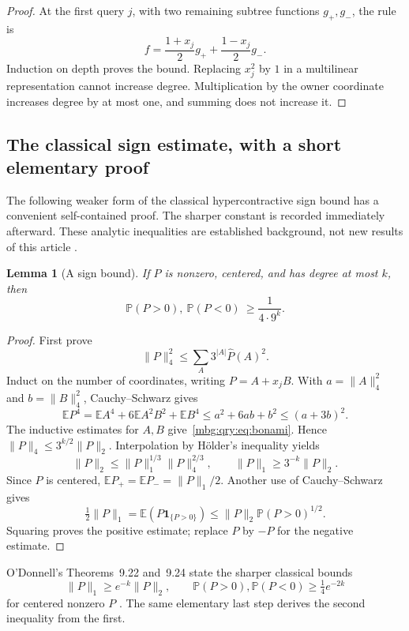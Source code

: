 \documentclass[11pt,letterpaper]{article}
\newtheorem{lemma}[theorem]{Lemma}
\theoremstyle{definition}
\newcommand{\E}{\mathbb E}
\newcommand{\Prb}{\mathbb P}
\newcommand{\ind}{\mathbf 1}
\begin{document}
\begin{proof}
At the first query \(j\), with two remaining subtree functions
\(g_+,g_-\), the rule is
\[
 f=\frac{1+x_j}{2}g_++\frac{1-x_j}{2}g_-.
\]
Induction on depth proves the bound. Replacing \(x_j^2\) by \(1\) in a
multilinear representation cannot increase degree. Multiplication by
the owner coordinate increases degree by at most one, and summing does
not increase it.
\end{proof}

\subsection{The classical sign estimate, with a short elementary proof}

The following weaker form of the classical hypercontractive sign bound
has a convenient self-contained proof. The sharper constant is recorded
immediately afterward. These analytic inequalities are established
background, not new results of this article \cite{qry:Bonami,qry:ODonnell}.

\begin{lemma}[A sign bound]
\label{mbg:qry:lem:sign}
If \(P\) is nonzero, centered, and has degree at most \(k\), then
\[
 \Prb(P>0),\ \Prb(P<0)\ \ge\frac{1}{4\cdot9^k}.
\]
\end{lemma}

\begin{proof}
First prove
\begin{equation}
 \|P\|_4^2\le\sum_A3^{|A|}\widehat P(A)^2.
 \label{mbg:qry:eq:bonami}
\end{equation}
Induct on the number of coordinates, writing \(P=A+x_jB\).
With \(a=\|A\|_4^2\) and \(b=\|B\|_4^2\), Cauchy--Schwarz gives
\[
 \E P^4=\E A^4+6\E A^2B^2+\E B^4
 \le a^2+6ab+b^2\le(a+3b)^2.
\]
The inductive estimates for \(A,B\) give~\eqref{mbg:qry:eq:bonami}. Hence
\(\|P\|_4\le3^{k/2}\|P\|_2\).
Interpolation by H\"older's inequality yields
\[
 \|P\|_2\le\|P\|_1^{1/3}\|P\|_4^{2/3},
 \qquad
 \|P\|_1\ge3^{-k}\|P\|_2.
\]
Since \(P\) is centered, \(\E P_+=\E P_-=\|P\|_1/2\).
Another use of Cauchy--Schwarz gives
\[
 \tfrac12\|P\|_1
 =\E(P\ind_{\{P>0\}})
 \le\|P\|_2\Prb(P>0)^{1/2}.
\]
Squaring proves the positive estimate; replace \(P\) by \(-P\) for
the negative estimate.
\end{proof}

O'Donnell's Theorems~9.22 and~9.24 state the sharper classical bounds
\begin{equation}
 \|P\|_1\ge e^{-k}\|P\|_2,\qquad
 \Prb(P>0),\Prb(P<0)\ge\tfrac14e^{-2k}
 \label{mbg:qry:eq:sharpclassical}
\end{equation}
for centered nonzero \(P\) \cite{qry:ODonnell}. The same elementary
last step derives the second inequality from the first.
\end{document}
